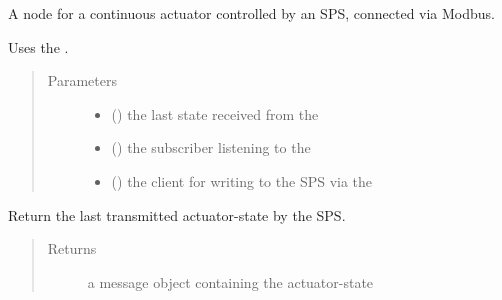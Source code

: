 \documentclass[a4paper,12pt,english]{article}
\begin{document}
\begin{fulllineitems}
\label{\detokenize{meso_control_pkg:meso_control_pkg.sps_continuous_actuator_node.SpsContinuousActuator}}
A node for a continuous actuator controlled by an SPS, connected via Modbus.

Uses the .
\begin{quote}\begin{description}
\item[{Parameters}] \leavevmode\begin{itemize}
\item {} 
 () \textendash{} the last state received from the 

\item {} 
 () \textendash{} the subscriber listening to the 

\item {} 
 () \textendash{} the client for writing to the SPS via the 

\end{itemize}

\end{description}\end{quote}

\begin{fulllineitems}
\label{\detokenize{meso_control_pkg:meso_control_pkg.sps_continuous_actuator_node.SpsContinuousActuator.poll_status}}
Return the last transmitted actuator-state by the SPS.
\begin{quote}\begin{description}
\item[{Returns}] \leavevmode
a message object containing the actuator-state


\end{description}
\end{quote}
\end{fulllineitems}
\end{fulllineitems}
\end{document}
